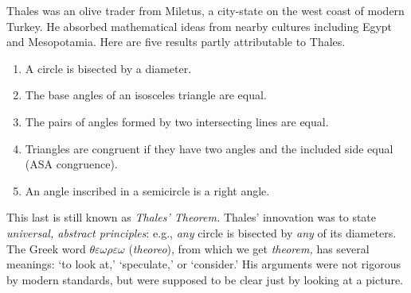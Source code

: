 
Thales was an olive trader from Miletus, a city-state on the west coast of modern Turkey. He absorbed mathematical ideas from nearby cultures including Egypt and Mesopotamia. Here are five results partly attributable to Thales.
\begin{enumerate}\itemsep2pt
  \item A circle is bisected by a diameter.
  \item The base angles of an isosceles triangle are equal.
  \item The pairs of angles formed by two intersecting lines are equal.
  \item Triangles are congruent if they have two angles and the included side equal (ASA congruence).
  \item\label{thm:thales} An angle inscribed in a semicircle is a right angle.
\end{enumerate}
This last is still known as \emph{Thales' Theorem.} Thales' innovation was to state \emph{universal, abstract principles}: e.g., \emph{any} circle is bisected by \emph{any} of its diameters. The Greek word $\theta\varepsilon\omega\rho\varepsilon\omega$ (\emph{theoreo}), from which we get \emph{theorem,} has several meanings: `to look at,' `speculate,' or `consider.' His arguments were not rigorous by modern standards, but were supposed to be clear just by looking at a picture.
